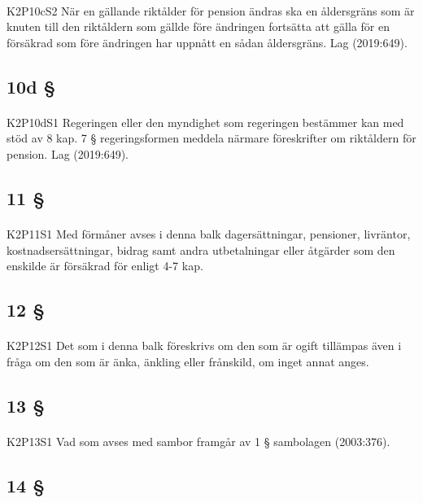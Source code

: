 \documentclass[a4paper,notitlepage,openany,10pt]{book}
\begin{document}
\paragraph*{}
{\tiny K2P10cS2}
När en gällande riktålder för pension ändras ska en åldersgräns som är knuten till den riktåldern som gällde före ändringen fortsätta att gälla för en försäkrad som före ändringen har uppnått en sådan åldersgräns.
Lag (2019:649).
\subsection*{10d §}
\paragraph*{}
{\tiny K2P10dS1}
Regeringen eller den myndighet som regeringen bestämmer kan med stöd av 8 kap. 7 § regeringsformen meddela närmare föreskrifter om riktåldern för pension.
Lag (2019:649).
\subsection*{11 §}
\paragraph*{}
{\tiny K2P11S1}
Med förmåner avses i denna balk dagersättningar, pensioner, livräntor, kostnadsersättningar, bidrag samt andra utbetalningar eller åtgärder som den enskilde är försäkrad för enligt 4-7 kap.
\subsection*{12 §}
\paragraph*{}
{\tiny K2P12S1}
Det som i denna balk föreskrivs om den som är ogift tillämpas även i fråga om den som är änka, änkling eller frånskild, om inget annat anges.
\subsection*{13 §}
\paragraph*{}
{\tiny K2P13S1}
Vad som avses med sambor framgår av 1 § sambolagen (2003:376).
\subsection*{14 §}
\end{document}
